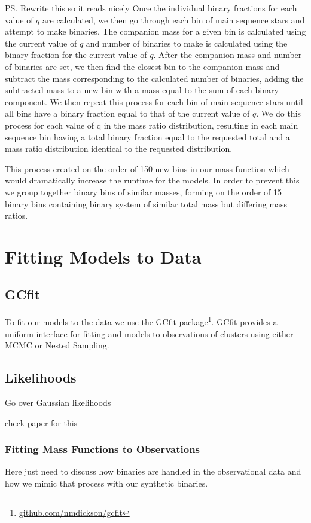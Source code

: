 \ps{Rewrite this so it reads nicely}
Once the individual binary fractions for each value of $q$ are calculated, we then go through each
bin of main sequence stars and attempt to make binaries. The companion mass for a given bin is
calculated using the current value of $q$ and number of binaries to make is calculated using the
binary fraction for the current value of $q$. After the companion mass and number of binaries are
set, we then find the closest bin to the companion mass and subtract the mass corresponding to the
calculated number of binaries, adding the subtracted mass to a new bin with a mass equal to the sum
of each binary component. We then repeat this process for each bin of main sequence stars until all
bins have a binary fraction equal to that of the current value of $q$. We do this process for each
value of q in the mass ratio distribution, resulting in each main sequence bin having a total binary
fraction equal to the requested total and a mass ratio distribution identical to the requested
distribution.

This process created on the order of 150 new bins in our mass function which would dramatically
increase the runtime for the  models. In order to prevent this we group together binary
bins of similar masses, forming on the order of 15 binary bins containing binary system of similar
total mass but differing mass ratios.





\section{Fitting Models to Data}

\subsection{GCfit}

To fit our models to the data we use the GCfit package\footnote{\url{github.com/nmdickson/gcfit}}.
GCfit provides a uniform interface for fitting \evolvemf{} and  models to observations
of clusters using either MCMC or Nested Sampling.

\subsection{Likelihoods}

Go over Gaussian likelihoods

check paper for this

\subsubsection{Fitting Mass Functions to Observations}


Here just need to discuss how binaries are handled in the observational data and how we mimic that
process with our synthetic binaries.
